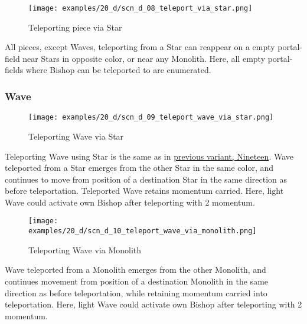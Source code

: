 \clearpage %

\noindent
\begin{figure}[!h]
\texttt{[image: examples/20\_d/scn\_d\_08\_teleport\_via\_star.png]}
\caption{Teleporting piece via Star}
\label{fig:scn_d_08_teleport_via_star}
\end{figure}

All pieces, except Waves, teleporting from a Star can reappear on a empty portal-field
near Stars in opposite color, or near any Monolith.
Here, all empty portal-fields where Bishop can be teleported to are enumerated.

\clearpage %

\subsubsection*{Wave}

\vspace*{-1.2\baselineskip}
\noindent
\begin{figure}[!h]
\texttt{[image: examples/20\_d/scn\_d\_09\_teleport\_wave\_via\_star.png]}
\caption{Teleporting Wave via Star}
\label{fig:scn_d_09_teleport_wave_via_star}
\end{figure}

Teleporting Wave using Star is the same as in \hyperref[fig:scn_n_04_teleport_move_3]{previous variant, Nineteen}.
Wave teleported from a Star emerges from the other Star in the same color,
and continues to move from position of a destination Star in the same
direction as before teleportation. Teleported Wave retains momentum carried.
Here, light Wave could activate own Bishop after teleporting with 2 momentum.

\clearpage %

\vspace*{-3.2\baselineskip}
\noindent
\begin{figure}[!h]
\texttt{[image: examples/20\_d/scn\_d\_10\_teleport\_wave\_via\_monolith.png]}
\caption{Teleporting Wave via Monolith}
\label{fig:scn_d_10_teleport_wave_via_monolith}
\end{figure}

\vspace*{-0.3\baselineskip}
Wave teleported from a Monolith emerges from the other Monolith, and continues
movement from position of a destination Monolith in the same direction as before
teleportation, while retaining momentum carried into teleportation.
Here, light Wave could activate own Bishop after teleporting with 2 momentum.

